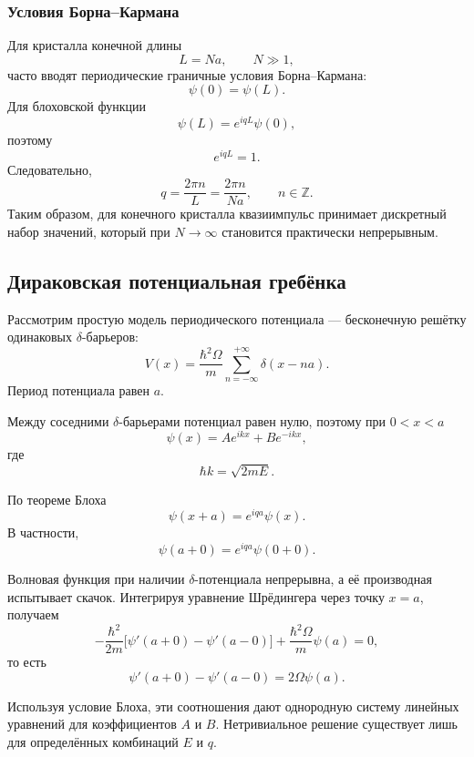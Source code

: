 \documentclass[12pt,a4paper]{article}
\begin{document}
\subsubsection{Условия Борна--Кармана}

Для кристалла конечной длины
\[
    L=Na,
    \qquad
    N\gg1,
\]
часто вводят периодические граничные условия Борна--Кармана:
\[
    \boxed{
        \psi(0)=\psi(L)
    }.
\]
Для блоховской функции
\[
    \psi(L)
    =
    e^{iqL}\psi(0),
\]
поэтому
\[
    e^{iqL}=1.
\]
Следовательно,
\[
    \boxed{
        q
        =
        \frac{2\pi n}{L}
        =
        \frac{2\pi n}{Na},
        \qquad
        n\in\mathbb Z
    }.
\]
Таким образом, для конечного кристалла квазиимпульс принимает
дискретный набор значений, который при $N\to\infty$ становится
практически непрерывным.


\subsection{Дираковская потенциальная гребёнка}

Рассмотрим простую модель периодического потенциала --- бесконечную
решётку одинаковых $\delta$-барьеров:
\[
    \boxed{
        V(x)
        =
        \frac{\hbar^2\Omega}{m}
        \sum_{n=-\infty}^{+\infty}
        \delta(x-na)
    }.
\]
Период потенциала равен $a$.

Между соседними $\delta$-барьерами потенциал равен нулю, поэтому при
$0<x<a$
\[
    \psi(x)
    =
    Ae^{ikx}
    +
    Be^{-ikx},
\]
где
\[
    \boxed{
        \hbar k=\sqrt{2mE}
    }.
\]

По теореме Блоха
\[
    \boxed{
        \psi(x+a)=e^{iqa}\psi(x)
    }.
\]
В частности,
\[
    \psi(a+0)=e^{iqa}\psi(0+0).
\]

Волновая функция при наличии $\delta$-потенциала непрерывна, а её
производная испытывает скачок. Интегрируя уравнение Шрёдингера через
точку $x=a$, получаем
\[
    -\frac{\hbar^2}{2m}
    \bigl[
        \psi'(a+0)-\psi'(a-0)
    \bigr]
    +
    \frac{\hbar^2\Omega}{m}\psi(a)
    =
    0,
\]
то есть
\[
    \boxed{
        \psi'(a+0)-\psi'(a-0)
        =
        2\Omega\psi(a)
    }.
\]

Используя условие Блоха, эти соотношения дают однородную систему
линейных уравнений для коэффициентов $A$ и $B$. Нетривиальное решение
существует лишь для определённых комбинаций $E$ и $q$.
\end{document}
